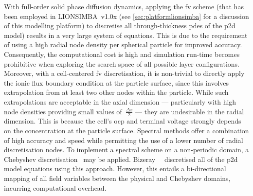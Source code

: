     With full-order solid phase diffusion dynamics, applying the \gls{fv} scheme
    (that has been employed in LIONSIMBA~v1.0x (see \cref{sec:platformlionsimba}
    for   a  discussion   of  this   modelling  platform)   to  discretise   all
    through-thickness \glspl{pde} of the \gls{p2d} model) results in a very large
    system of equations. This  is due to the requirement of  using a high radial
    node density per spherical particle for improved accuracy. Consequently, the
    computational cost is  high and simulation run-time  becomes prohibitive when
    exploring the search  space of all possible  layer configurations. Moreover,
    with a cell-centered \gls{fv} discretisation,  it is non-trivial to directly
    apply  the ionic  flux boundary  condition  at the  particle surface,  since
    this  involves  extrapolation from  at  least  two  other nodes  within  the
    particle. While  such extrapolations are  acceptable in the  axial dimension
    ---  particularly  with  high  node  densities  providing  small  values  of~$\frac{\Delta x}{2}$ --- they are  undesirable in the radial dimension. This
    is because the cell's \gls{ocp} and terminal voltage strongly depends on the
    concentration at the particle surface.  Spectral methods offer a combination
    of  high accuracy  and speed  while  permitting the  use of  a lower  number
    of  radial  discretisation  nodes.  To  implement a  spectral  scheme  on  a
    non-periodic domain, a  Chebyshev discretisation~\cite{Trefethen2000} may be
    applied. Bizeray~\etal{}~\cite{Bizeray2015} discretised all of the \gls{p2d}
    model equations using this approach.  However, this entails a bi-directional
    mapping of all  field variables between the physical  and Chebyshev domains,
    incurring computational overhead.

